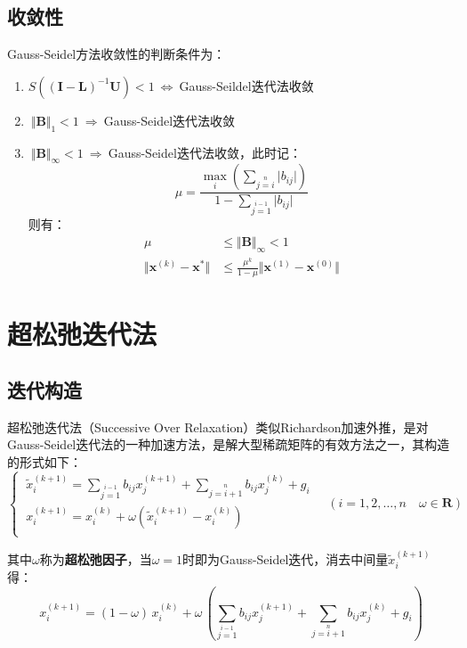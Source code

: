 \subsection{收敛性}
Gauss-Seidel方法收敛性的判断条件为：
\begin{enumerate}
    \item $S((\boldsymbol{I}-\boldsymbol{L})^{-1}\boldsymbol{U})<1\ \Leftrightarrow \ $Gauss-Seildel迭代法收敛
    \item $\ \Vert\boldsymbol{B}\Vert_1 < 1 \ \Rightarrow \ $Gauss-Seidel迭代法收敛
    \item $\ \Vert\boldsymbol{B}\Vert_\infty < 1 \ \Rightarrow \ $Gauss-Seidel迭代法收敛，此时记：
        \[
            \mu = \frac{\max_i(\sum\limits_{j=i}\limits^{n}\vert b_{ij}\vert)} {1-\sum\limits_{j=1}\limits^{i-1}\vert b_{ij}\vert}
        \]
        则有：
        \begin{align}
            \mu &\leqslant \Vert\boldsymbol{B}\Vert_{\infty} < 1 \\[3mm]
            \Vert\boldsymbol{x}^{(k)}-\boldsymbol{x}^{\ast}\Vert &\leqslant \frac{\mu^{k}}{1-\mu} \Vert\boldsymbol{x}^{(1)}-\boldsymbol{x}^{(0)}\Vert 
        \end{align}
\end{enumerate}


\section{超松弛迭代法}
\subsection{迭代构造}
超松弛迭代法（Successive Over Relaxation）类似Richardson加速外推，是对Gauss-Seidel迭代法的一种加速方法，是解大型稀疏矩阵的有效方法之一，其构造的形式如下：
\[\begin{cases}
    \ \widetilde{x}_i^{(k+1)} = \sum\limits_{j=1}\limits^{i-1} b_{ij} x_j^{(k+1)} + \sum\limits_{j=i+1}\limits^{n}b_{ij} x_j^{(k)} + g_i \\
    \ x_i^{(k+1)} = x_i^{(k)} + \omega(\widetilde{x}_i^{(k+1)} - x_i^{(k)}) \\
\end{cases} \quad (i=1,2,\dots,n\quad \omega \in \mathbf{R})\]

其中$\omega$称为\textbf{超松弛因子}，当$\omega=1$时即为Gauss-Seidel迭代，消去中间量$\widetilde{x}_i^{(k+1)}$得：
\[
    x_i^{(k+1)} = (1-\omega)\,x_i^{(k)} + \omega\,(\sum\limits_{j=1}\limits^{i-1} b_{ij} x_j^{(k+1)} + \sum\limits_{j=i+1}\limits^{n}b_{ij} x_j^{(k)} + g_i)
\]

